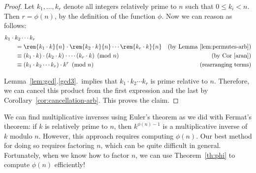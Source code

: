 \begin{proof}
Let $k_1, \dots, k_r$ denote all integers relatively prime to $n$
such that $0 \leq k_i < n$.  Then $r = \phi(n)$, by the definition of
the function $\phi$.  Now we can reason as follows:
%
\begin{align*}
\lefteqn{k_1 \cdot k_2 \cdots k_r} \hspace{0.25in} \\
& =
\rem{k_1 \cdot k}{n} \cdot 
\rem{k_2 \cdot k}{n} \cdots 
\rem{k_r \cdot k}{n} & \text{(by Lemma~\ref{lem:permutes-arb})}
\\
& \equiv 
(k_1 \cdot k) \cdot 
(k_2 \cdot k) \cdot 
\cdots 
(k_r \cdot k) \pmod{n} & \text{(by Cor~\ref{aran})}
\\
& \equiv  
(k_1 \cdot k_2 \cdots k_r) \cdot k^r \pmod{n} & \text{(rearranging terms)}
\end{align*}

Lemma~\ref{lem:gcd}.\ref{gcd3}.\ implies that $k_1 \cdot k_2
\cdots k_r$ is prime relative to $n$.  Therefore, we can cancel this
product from the first expression and the last by
Corollary~\ref{cor:cancellation-arb}.  This proves the claim.
\end{proof}

We can find multiplicative inverses using Euler's theorem as we did
with Fermat's theorem: if $k$ is relatively prime to $n$, then
$k^{\phi(n) - 1}$ is a multiplicative inverse of $k$ modulo $n$.
However, this approach requires computing $\phi(n)$.  Our best method
for doing so requires factoring $n$, which can be quite difficult in
general.  Fortunately, when we know how to factor $n$, we can
use Theorem~\ref{th:phi} to compute $\phi(n)$ efficiently!




